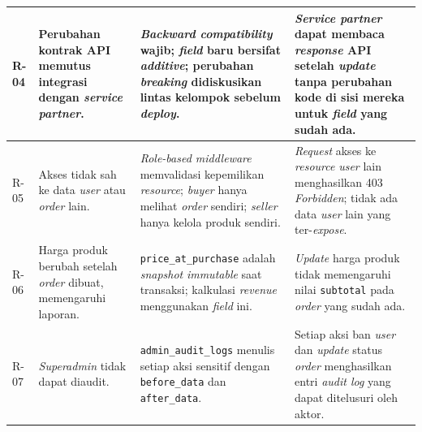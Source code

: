 \begin{longtable}{|L{1cm}|L{3.5cm}|L{4.5cm}|L{5.5cm}|}
    \hline
    R-04
        & Perubahan kontrak API memutus integrasi dengan \textit{service partner}.
        & \textit{Backward compatibility} wajib; \textit{field} baru bersifat
          \textit{additive}; perubahan \textit{breaking} didiskusikan lintas
          kelompok sebelum \textit{deploy}.
        & \textit{Service partner} dapat membaca \textit{response} API setelah
          \textit{update} tanpa perubahan kode di sisi mereka untuk \textit{field}
          yang sudah ada. \\
    \hline
    R-05
        & Akses tidak sah ke data \textit{user} atau \textit{order} lain.
        & \textit{Role-based middleware} memvalidasi kepemilikan \textit{resource};
          \textit{buyer} hanya melihat \textit{order} sendiri; \textit{seller}
          hanya kelola produk sendiri.
        & \textit{Request} akses ke \textit{resource} \textit{user} lain
          menghasilkan 403 \textit{Forbidden}; tidak ada data \textit{user} lain
          yang ter-\textit{expose}. \\
    \hline
    R-06
        & Harga produk berubah setelah \textit{order} dibuat, memengaruhi laporan.
        & \texttt{price\_at\_purchase} adalah \textit{snapshot} \textit{immutable}
          saat transaksi; kalkulasi \textit{revenue} menggunakan \textit{field} ini.
        & \textit{Update} harga produk tidak memengaruhi nilai \texttt{subtotal}
          pada \textit{order} yang sudah ada. \\
    \hline
    R-07
        & \textit{Superadmin} tidak dapat diaudit.
        & \texttt{admin\_audit\_logs} menulis setiap aksi sensitif dengan
          \texttt{before\_data} dan \texttt{after\_data}.
        & Setiap aksi ban \textit{user} dan \textit{update} status \textit{order}
          menghasilkan entri \textit{audit log} yang dapat ditelusuri oleh
          aktor. \\
    \hline
\end{longtable}
